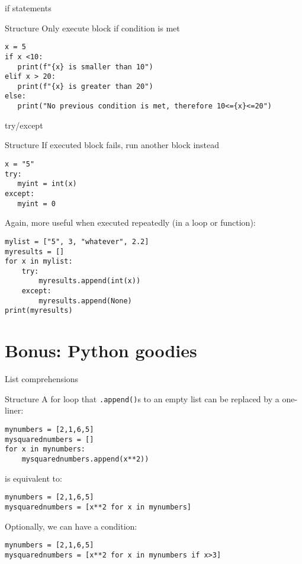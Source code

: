 \begin{frame}[fragile]{if statements}
	\begin{block}{Structure}
		Only execute block if condition is met
	\end{block}
	\begin{verbatim}
x = 5
if x <10:
   print(f"{x} is smaller than 10")
elif x > 20:
   print(f"{x} is greater than 20")
else:
   print("No previous condition is met, therefore 10<={x}<=20")
\end{verbatim}

\end{frame}





\begin{frame}[fragile]{try/except}
\begin{block}{Structure}
If executed block fails, run another block instead
\end{block}
\begin{verbatim}
x = "5"
try: 
   myint = int(x)
except:
   myint = 0
\end{verbatim}

\pause 
\small{Again, more useful when executed repeatedly (in a loop or function):}
\begin{verbatim}
mylist = ["5", 3, "whatever", 2.2]
myresults = []
for x in mylist:
    try: 
        myresults.append(int(x))
    except:
        myresults.append(None)
print(myresults)
\end{verbatim}
\end{frame}





\section[Bonus]{Bonus: Python goodies}

\begin{frame}[fragile]{List comprehensions}
  \begin{block}{Structure}
    \small
A for loop that \texttt{.append()}s to an empty list can be replaced by a one-liner:
\end{block}
\begin{verbatim}
mynumbers = [2,1,6,5]
mysquarednumbers = []
for x in mynumbers:
    mysquarednumbers.append(x**2))
\end{verbatim}
is equivalent to:
\begin{verbatim}
mynumbers = [2,1,6,5]
mysquarednumbers = [x**2 for x in mynumbers]
\end{verbatim}
\pause 
\small Optionally, we can have a condition:
\begin{verbatim}
mynumbers = [2,1,6,5]
mysquarednumbers = [x**2 for x in mynumbers if x>3]
\end{verbatim}

\end{frame}




